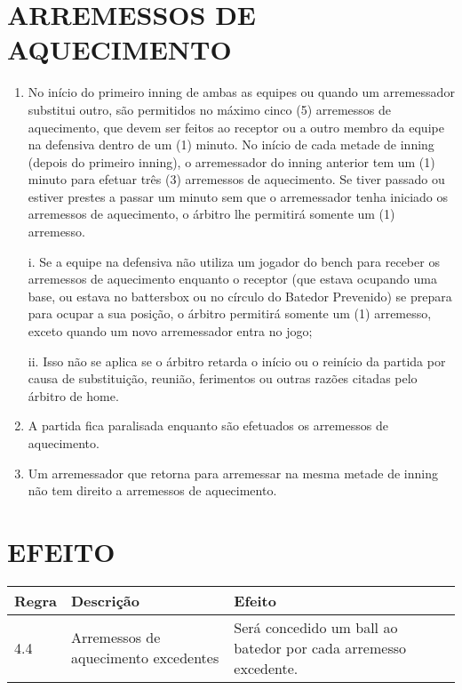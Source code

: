\section{ARREMESSOS DE AQUECIMENTO}

\begin{enumerate}[label=(\alph*)]
	\item No início do primeiro \gls{inning} de ambas as equipes ou quando um arremessador substitui outro, são permitidos no máximo cinco (5) arremessos de aquecimento, que devem ser feitos ao receptor ou a outro membro da equipe na  defensiva dentro de um (1) minuto. No início de cada metade de \gls{inning} (depois do primeiro \gls{inning}), o arremessador do \gls{inning} anterior tem um (1) minuto para  efetuar três (3) arremessos de aquecimento. Se tiver passado ou estiver prestes a passar um minuto sem que o arremessador tenha iniciado os arremessos de aquecimento, o árbitro lhe permitirá somente um (1) arremesso.

	i. Se a equipe na defensiva não utiliza um jogador do \gls{bench} para receber os arremessos de aquecimento enquanto o receptor (que estava ocupando uma base, ou estava no \gls{battersbox} ou no círculo do Batedor
	Prevenido) se prepara para ocupar a sua posição, o árbitro permitirá somente um (1) arremesso, exceto quando um novo arremessador entra no jogo;

	ii. Isso não se aplica se o árbitro retarda o início ou o reinício da partida por causa de substituição, reunião, ferimentos ou outras razões citadas  pelo árbitro de \gls{home}.

	\item  A partida fica paralisada enquanto são efetuados os arremessos de aquecimento.
	\item  Um arremessador que retorna para arremessar na mesma metade de \gls{inning} não tem direito a arremessos de aquecimento.
\end{enumerate}

\section*{EFEITO}

{\footnotesize\begin{tabular}{p{15mm}p{80mm}p{70mm}}
		Regra& Descrição & Efeito\\\hline
		4.4 & Arremessos de aquecimento excedentes &
		Será concedido um \gls{ball} ao batedor por cada arremesso excedente.
\end{tabular}}

